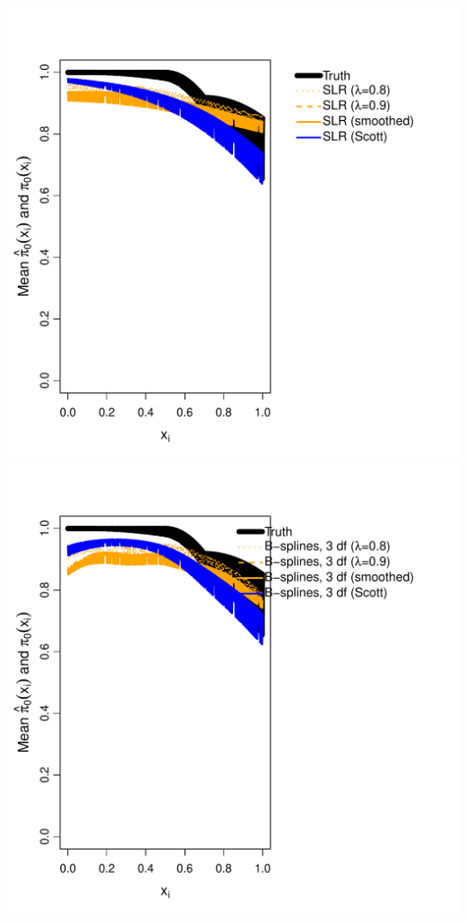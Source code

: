 \documentclass{article}\usepackage[]{graphicx}\usepackage[]{color}
\makeatletter
\def\maxwidth{ %
  \ifdim\Gin@nat@width>\linewidth
    \linewidth
  \else
    \Gin@nat@width
  \fi
}
\newenvironment{knitrout}{}{} %
\makeatother
\begin{document}
\begin{knitrout}
{\includegraphics[width=\maxwidth]{Figures/unnamed-chunk-1-11} 
\includegraphics[width=\maxwidth]{Figures/unnamed-chunk-1-12} 
}
\end{knitrout}
\end{document}
